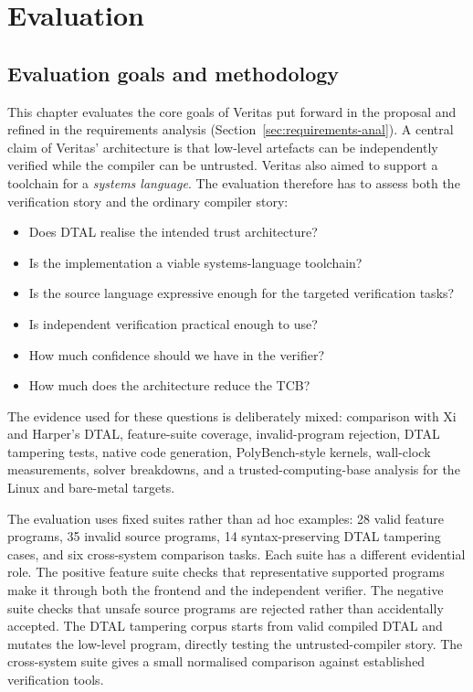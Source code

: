 \chapter{Evaluation}\label{ch:eval}

\section{Evaluation goals and methodology}

This chapter evaluates the core goals of Veritas put forward in the proposal and refined in the requirements analysis (Section~\ref{sec:requirements-anal}).
A central claim of Veritas' architecture is that low-level artefacts can be independently verified while the compiler can be untrusted. Veritas also aimed to support a toolchain for a \emph{systems language}. The evaluation therefore has to assess both the verification story and the ordinary compiler story:

\begin{itemize}
  \item Does DTAL realise the intended trust architecture?
  \item Is the implementation a viable systems-language toolchain?
  \item Is the source language expressive enough for the targeted verification tasks?
  \item Is independent verification practical enough to use?
  \item How much confidence should we have in the verifier?
  \item How much does the architecture reduce the TCB?
\end{itemize}

The evidence used for these questions is deliberately mixed: comparison with Xi and Harper's DTAL, feature-suite coverage, invalid-program rejection, DTAL tampering tests, native code generation, PolyBench-style kernels, wall-clock measurements, solver breakdowns, and a trusted-computing-base analysis for the Linux and bare-metal targets.

The evaluation uses fixed suites rather than ad hoc examples: 28 valid feature programs, 35 invalid source programs, 14 syntax-preserving DTAL tampering cases, and six cross-system comparison tasks. Each suite has a different evidential role. The positive feature suite checks that representative supported programs make it through both the frontend and the independent verifier. The negative suite checks that unsafe source programs are rejected rather than accidentally accepted. The DTAL tampering corpus starts from valid compiled DTAL and mutates the low-level program, directly testing the untrusted-compiler story. The cross-system suite gives a small normalised comparison against established verification tools.


